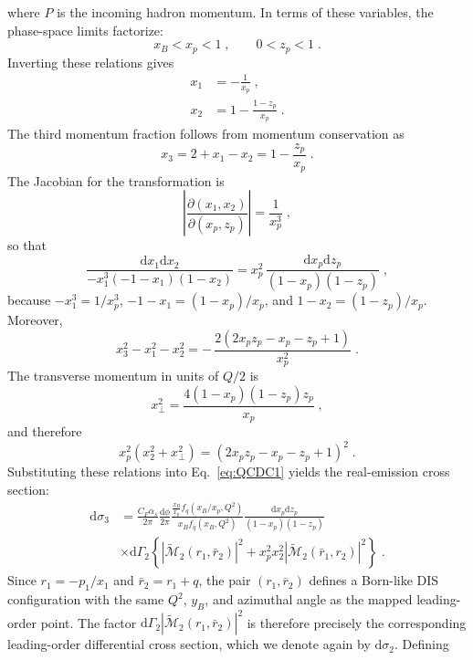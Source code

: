 \documentclass[a4paper,11pt]{article}
\begin{document}
where $P$ is the incoming hadron momentum. In terms of these variables, the phase-space limits factorize:
\begin{equation}
  x_B < x_p < 1\;, \qquad 0 < z_p < 1\;.
\end{equation}
Inverting these relations gives
\begin{align}
  x_1 &= -\frac{1}{x_p}\;, \\
  x_2 &= 1-\frac{1-z_p}{x_p}\;.
\end{align}
The third momentum fraction follows from momentum conservation as
\begin{equation}
  x_3 = 2+x_1-x_2 = 1-\frac{z_p}{x_p}\;.
\end{equation}
The Jacobian for the transformation is
\begin{equation}
  \left|\frac{\partial(x_1,x_2)}{\partial(x_p,z_p)}\right| = \frac{1}{x_p^3}\;,
\end{equation}
so that
\begin{equation}
  \frac{\mathrm{d} x_1 \mathrm{d}x_2}{-x_1^3(-1-x_1)(1-x_2)}
  = x_p^2\,\frac{\mathrm{d} x_p \mathrm{d}z_p}{(1-x_p)(1-z_p)}\;,
\end{equation}
because $-x_1^3=1/x_p^3$, $-1-x_1=(1-x_p)/x_p$, and $1-x_2=(1-z_p)/x_p$. Moreover,
\begin{equation}
  x_3^2-x_1^2-x_2^2 = -\,\frac{2(2x_pz_p-x_p-z_p+1)}{x_p^2}\;.
\end{equation}
The transverse momentum in units of $Q/2$ is
\begin{equation}
  x_\perp^2 = \frac{4(1-x_p)(1-z_p)z_p}{x_p}\;,
\end{equation}
and therefore
\begin{equation}
  x_p^2(x_2^2+x_\perp^2) = (2x_pz_p-x_p-z_p+1)^2\;.
\end{equation}
Substituting these relations into Eq.~\eqref{eq:QCDC1} yields the real-emission cross section:
\begin{align}
  \mathrm{d}\sigma_3 &= \frac{C_F\alpha_s}{2\pi}\frac{\mathrm{d}\phi}{2\pi}
    \frac{\frac{x_B}{x_p} f_q(x_B/x_p,Q^2)}
         { x_B    f_q( x_B    ,Q^2)}
    \frac{\mathrm{d} x_p \mathrm{d}z_p}{(1-x_p)(1-z_p)}\;
\nonumber\\&
   \times \mathrm{d} \Gamma_2 \left\{ |\widetilde{\mathcal{M}}_2(r_1,\bar{r}_2)|^2 +
        x_p^2 x_2^2 |\widetilde{\mathcal{M}}_2(\bar{r}_1,r_2)|^2 \right\}\;.
\label{eq:QCDC2}
\end{align}
Since $r_1 = -p_1/x_1$ and $\bar{r}_2 = r_1 + q$, the pair $(r_1,\bar{r}_2)$ defines a Born-like DIS configuration with the same $Q^2$, $y_B$, and azimuthal angle as the mapped leading-order point. The factor $\mathrm{d} \Gamma_2 |\widetilde{\mathcal{M}}_2(r_1,\bar{r}_2)|^2$ is therefore precisely the corresponding leading-order differential cross section, which we denote again by $\mathrm{d}\sigma_2$. Defining
\end{document}
